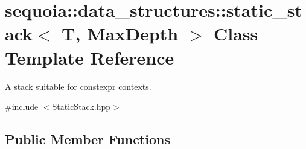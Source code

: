 \hypertarget{classsequoia_1_1data__structures_1_1static__stack}{}\section{sequoia\+::data\+\_\+structures\+::static\+\_\+stack$<$ T, Max\+Depth $>$ Class Template Reference}
\label{classsequoia_1_1data__structures_1_1static__stack}


A stack suitable for constexpr contexts.  




{\ttfamily \#include $<$Static\+Stack.\+hpp$>$}

\subsection*{Public Member Functions}
